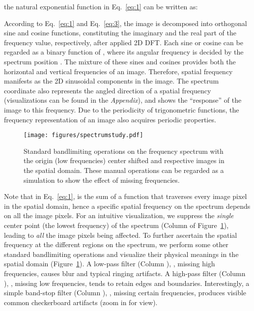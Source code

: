 \documentclass[10pt,twocolumn,letterpaper]{article}
\begin{document}
the natural exponential function in Eq.~\eqref{eq:1} can be written as:


According to Eq.~\eqref{eq:1} and Eq.~\eqref{eq:3}, the image is decomposed into orthogonal sine and cosine functions, constituting the imaginary and the real part of the frequency value, respectively, after applied 2D DFT.
Each sine or cosine can be regarded as a binary function of , where its angular frequency is decided by the spectrum position .
The mixture of these sines and cosines provides both the horizontal and vertical frequencies of an image.
Therefore, spatial frequency manifests as the 2D sinusoidal components in the image.
The spectrum coordinate  also represents the angled direction of a spatial frequency (visualizations can be found in the \textit{Appendix}), and  shows the ``response'' of the image to this frequency.
Due to the periodicity of trigonometric functions, the frequency representation of an image also acquires periodic properties.


\begin{figure}[t]
	\centering
\texttt{[image: figures/spectrumstudy.pdf]}
\caption{Standard bandlimiting operations on the frequency spectrum with the origin (low frequencies) center shifted and respective images in the spatial domain. These manual operations can be regarded as a simulation to show the effect of missing frequencies.}
	\label{fig:spectrumstudy}
	\vspace{-0.35cm}
\end{figure}


Note that in Eq.~\eqref{eq:1},  is the sum of a function that traverses every image pixel in the spatial domain, hence a specific spatial frequency on the spectrum depends on all the image pixels.
For an intuitive visualization, we suppress the \textit{single} center point (the lowest frequency) of the spectrum (Column  of Figure~\ref{fig:spectrumstudy}), leading to \textit{all} the image pixels being affected.
To further ascertain the spatial frequency at the different regions on the spectrum, we perform some other standard bandlimiting operations and visualize their physical meanings in the spatial domain (Figure~\ref{fig:spectrumstudy}).
A low-pass filter (Column ), \ie, missing high frequencies, causes blur and typical ringing artifacts. A high-pass filter (Column ), \ie, missing low frequencies, tends to retain edges and boundaries. Interestingly, a simple band-stop filter (Column ), \ie, missing certain frequencies, produces visible common checkerboard artifacts (zoom in for view).
\end{document}
